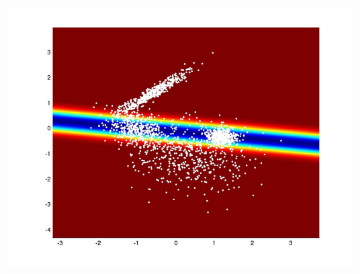 \documentclass[useAMS,usenatbib,fleqn]{mn2e}
\begin{document}
\begin{figure}
\begin{subfigure}[b]{70 px}
                \includegraphics[trim = 150px 100px 150px 70px, clip=true,width=\textwidth]{VC1.jpg}
        \end{subfigure}
       

\end{figure}
\end{document}
